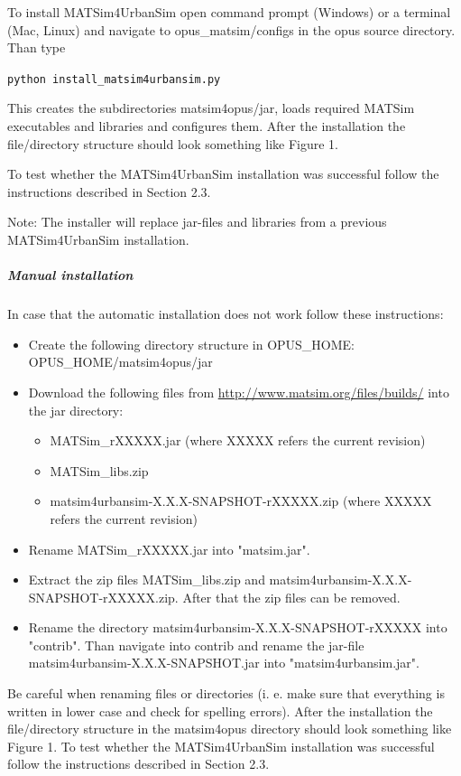 To install MATSim4UrbanSim open command prompt (Windows) or a  terminal (Mac, Linux) and navigate to opus\_matsim/configs in the opus  source directory. Than type


\texttt{python install\_matsim4urbansim.py}

This creates the subdirectories matsim4opus/jar, loads required  MATSim executables and libraries and configures them. After the  installation the file/directory structure should look something like  Figure 1.

To test whether the MATSim4UrbanSim installation was successful follow the instructions described in Section 2.3.

Note: The installer will replace jar-files and libraries from a previous MATSim4UrbanSim installation.

\subparagraph{Manual installation}

In case that the automatic installation does not work follow these instructions:
\begin{itemize}
	\item Create the following directory structure in OPUS\_HOME: OPUS\_HOME/matsim4opus/jar
	\item Download the following files from \href{http://www.matsim.org/files/builds/}{http://www.matsim.org/files/builds/} into the jar directory:   
\begin{itemize}
	\item MATSim\_rXXXXX.jar (where XXXXX refers the current revision)
	\item MATSim\_libs.zip
	\item matsim4urbansim-X.X.X-SNAPSHOT-rXXXXX.zip (where XXXXX refers the current revision)
\end{itemize}
	\item Rename MATSim\_rXXXXX.jar into "matsim.jar".
	\item Extract the zip files MATSim\_libs.zip and matsim4urbansim-X.X.X-SNAPSHOT-rXXXXX.zip. After that the zip files can be removed.
	\item Rename the directory matsim4urbansim-X.X.X-SNAPSHOT-rXXXXX into  "contrib". Than navigate into contrib and rename the jar-file  matsim4urbansim-X.X.X-SNAPSHOT.jar into "matsim4urbansim.jar".
\end{itemize}

Be careful when renaming files or directories (i. e. make sure  that everything is written in lower case and check for spelling errors).  After the installation the file/directory structure in the matsim4opus  directory should look something like Figure 1. To test whether the  MATSim4UrbanSim installation was successful follow the instructions  described in Section 2.3.

